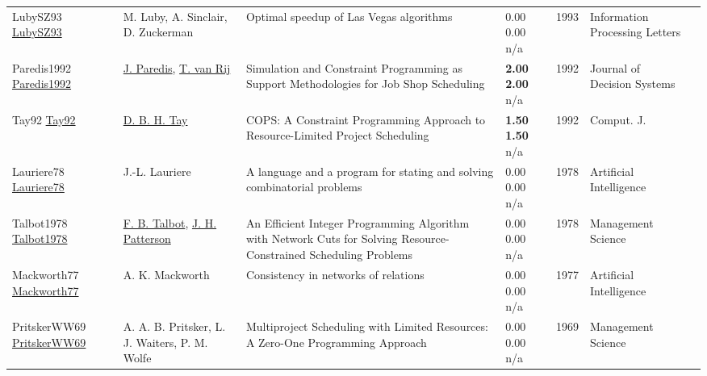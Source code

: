 {\begin{longtable}{p{3cm}p{5cm}p{10cm}p{1cm}rp{2.5cm}l}
LubySZ93 \href{http://dx.doi.org/10.1016/0020-0190(93)90029-9}{LubySZ93} & M. Luby, A. Sinclair, D. Zuckerman & Optimal speedup of Las Vegas algorithms & \noindent{}\textcolor{black!50}{0.00} \textcolor{black!50}{0.00} n/a & 1993 & Information Processing Letters & \cite{LubySZ93}\\
Paredis1992 \href{http://dx.doi.org/10.1080/12460125.1992.10511509}{Paredis1992} & \hyperref[auth:a1995]{J. Paredis}, \hyperref[auth:a1996]{T. van Rij} & Simulation and Constraint Programming as Support Methodologies for Job Shop Scheduling & \noindent{}\textbf{2.00} \textbf{2.00} n/a & 1992 & Journal of Decision Systems & \cite{Paredis1992}\\
Tay92 \href{}{Tay92} & \hyperref[auth:a700]{D. B. H. Tay} & {COPS:} {A} Constraint Programming Approach to Resource-Limited Project Scheduling & \noindent{}\textbf{1.50} \textbf{1.50} n/a & 1992 & Comput. J. & \cite{Tay92}\\
Lauriere78 \href{http://dx.doi.org/10.1016/0004-3702(78)90029-2}{Lauriere78} & J.-L. Lauriere & A language and a program for stating and solving combinatorial problems & \noindent{}\textcolor{black!50}{0.00} \textcolor{black!50}{0.00} n/a & 1978 & Artificial Intelligence & \cite{Lauriere78}\\
Talbot1978 \href{http://dx.doi.org/10.1287/mnsc.24.11.1163}{Talbot1978} & \hyperref[auth:a1495]{F. B. Talbot}, \hyperref[auth:a1496]{J. H. Patterson} & An Efficient Integer Programming Algorithm with Network Cuts for Solving Resource-Constrained Scheduling Problems & \noindent{}\textcolor{black!50}{0.00} \textcolor{black!50}{0.00} n/a & 1978 & Management Science & \cite{Talbot1978}\\
Mackworth77 \href{http://dx.doi.org/10.1016/0004-3702(77)90007-8}{Mackworth77} & A. K. Mackworth & Consistency in networks of relations & \noindent{}\textcolor{black!50}{0.00} \textcolor{black!50}{0.00} n/a & 1977 & Artificial Intelligence & \cite{Mackworth77}\\
PritskerWW69 \href{http://dx.doi.org/10.1287/mnsc.16.1.93}{PritskerWW69} & A. A. B. Pritsker, L. J. Waiters, P. M. Wolfe & Multiproject Scheduling with Limited Resources: A Zero-One Programming Approach & \noindent{}\textcolor{black!50}{0.00} \textcolor{black!50}{0.00} n/a & 1969 & Management Science & \cite{PritskerWW69}\\
\end{longtable}
}


